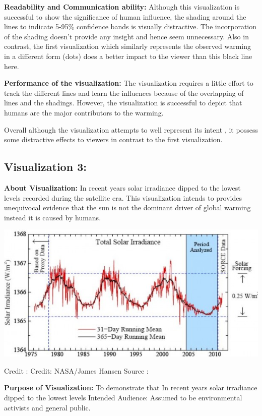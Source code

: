 \documentclass[]{book}
\begin{document}
\textbf{Readability and Communication ability:} Although this visualization is successful to show the significance of human influence, the shading around the lines to indicate 5-95\% confidence bands is visually distractive. The incorporation of the shading doesn't provide any insight and hence seem unnecessary. Also in contrast, the first visualization which similarly represents the observed warming in a different form (dots) does a better impact to the viewer than this black line here.

\textbf{Performance of the visualization:} The visualization requires a little effort to track the different lines and learn the influences because of the overlapping of lines and the shadings. However, the visualization is successful to depict that humans are the major contributors to the warming.

Overall although the visualization attempts to well represent its intent , it possess some distractive effects to viewers in contrast to the first visualization.

\hypertarget{visualization-3}{%
\subsection{Visualization 3:}\label{visualization-3}}

\textbf{About Visualization:} In recent years solar irradiance dipped to the lowest levels recorded during the satellite era. This visualization intends to provides unequivocal evidence that the sun is not the dominant driver of global warming instead it is caused by humans.

\includegraphics{images/Vz4-Solar.png}

Credit : Credit: NASA/James Hansen
Source : \citep{NASA}

\textbf{Purpose of Visualization:} To demonstrate that In recent years solar irradiance dipped to the lowest levels
Intended Audience: Assumed to be environmental activists and general public.
\end{document}
